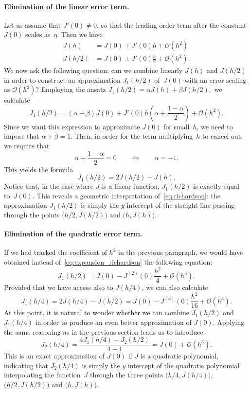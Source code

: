 \paragraph{Elimination of the linear error term.}
Let us assume that $J'(0) \neq 0$,
so that the leading order term after the constant $J(0)$ scales as~$\eta$.
Then we have
\begin{align*}
    J(h) &= J(0) + J'(0) h + \mathcal O(h^2) \\
    J(h/2) &= J(0) + J'(0) \frac{h}{2} + \mathcal O(h^2).
\end{align*}
We now ask the following question:
can we combine linearly $J(h)$ and $J(h/2)$ in order to construct an approximation $J_1(h/2)$ of~$J(0)$ with an error scaling as $\mathcal O(h^2)$?
Employing the ansatz
\(
    J_1(h/2) = \alpha J(h) + \beta J(h/2),
\)
we calculate
\begin{equation}
    \label{eq:expansion_richardson}
    J_1(h/2) = (\alpha + \beta) J(0) + J'(0) h \left(\alpha + \frac{1 - \alpha}{2}\right) + \mathcal O(h^2).
\end{equation}
Since we want this expression to approximate $J(0)$ for small~$h$,
we need to impose that $\alpha + \beta = 1$.
Then, in order for the term multiplying~$h$ to cancel out,
we require that
\[
    \alpha + \frac{1 - \alpha}{2} = 0
    \qquad \Leftrightarrow \qquad
    \alpha = - 1.
\]
This yields the formula
\begin{equation}
    \label{eq:richardson}
    J_1(h/2) = 2J(h/2) - J(h).
\end{equation}
Notice that, in the case where $J$ is a linear function,
$J_1(h/2)$ is exactly equal to~$J(0)$.
This reveals a geometric interpretation of~\eqref{eq:richardson}:
the approximation $J_1(h/2)$ is simply the $y$ intercept of the straight line passing through the points $\bigl(h/2, J(h/2)\bigr)$ and $\bigl(h, J(h)\bigr)$.

\paragraph{Elimination of the quadratic error term.}
If we had tracked the coefficient of $h^2$ in the previous paragraph,
we would have obtained instead of~\eqref{eq:expansion_richardson} the following equation:
\[
    J_1(h/2) = J(0) - J^{(2)}(0) \frac{h^2}{4} + \mathcal O(h^3).
\]
Provided that we have access also to $J(h/4)$,
we can also calculate
\[
   J_1(h/4) = 2J(h/4) - J(h/2) = J(0) - J^{(3)}(0) \frac{h^2}{16} + \mathcal O(h^3).
\]
At this point,
it is natural to wonder whether we can combine $J_1(h/2)$ and $J_1(h/4)$ in order to produce an even better approximation of $J(0)$.
Applying the same reasoning as in the previous section leads us to introduce
\[
    J_2(h/4) = \frac{4 J_1(h/4) - J_2(h/2)}{4 - 1} = J(0) + \mathcal O(h^3).
\]
This is an exact approximation of $J(0)$ if $J$ is a quadratic polynomial,
indicating that $J_2(h/4)$ is simply the $y$ intercept of the quadratic polynomial interpolating the function~$J$ through the three points
$\bigl(h/4, J(h/4)\bigr)$, $\bigl(h/2, J(h/2)\bigr)$ and $\bigl(h, J(h)\bigr)$.


